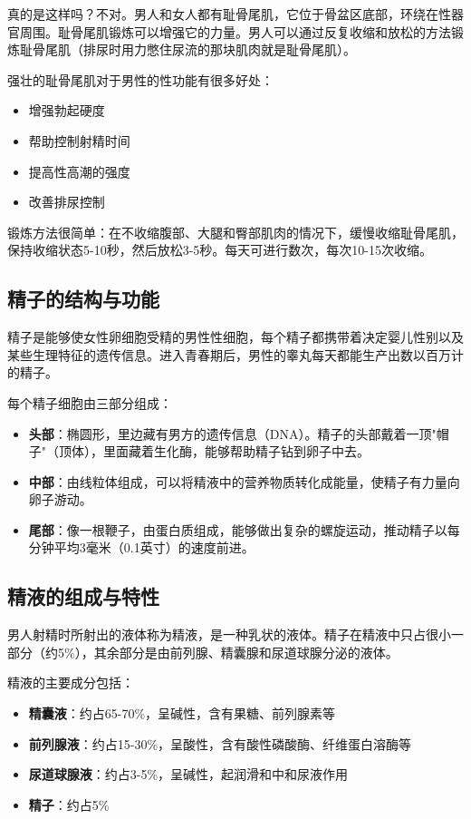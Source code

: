真的是这样吗？不对。男人和女人都有耻骨尾肌，它位于骨盆区底部，环绕在性器官周围。耻骨尾肌锻炼可以增强它的力量。男人可以通过反复收缩和放松的方法锻炼耻骨尾肌（排尿时用力憋住尿流的那块肌肉就是耻骨尾肌）。

强壮的耻骨尾肌对于男性的性功能有很多好处：
\begin{itemize}
    \item 增强勃起硬度
    \item 帮助控制射精时间
    \item 提高性高潮的强度
    \item 改善排尿控制
\end{itemize}

锻炼方法很简单：在不收缩腹部、大腿和臀部肌肉的情况下，缓慢收缩耻骨尾肌，保持收缩状态5-10秒，然后放松3-5秒。每天可进行数次，每次10-15次收缩。

\subsection{精子的结构与功能}

精子是能够使女性卵细胞受精的男性性细胞，每个精子都携带着决定婴儿性别以及某些生理特征的遗传信息。进入青春期后，男性的睾丸每天都能生产出数以百万计的精子。

每个精子细胞由三部分组成：

\begin{itemize}
    \item \textbf{头部}：椭圆形，里边藏有男方的遗传信息（DNA）。精子的头部戴着一顶"帽子"（顶体），里面藏着生化酶，能够帮助精子钻到卵子中去。
    \item \textbf{中部}：由线粒体组成，可以将精液中的营养物质转化成能量，使精子有力量向卵子游动。
    \item \textbf{尾部}：像一根鞭子，由蛋白质组成，能够做出复杂的螺旋运动，推动精子以每分钟平均3毫米（0.1英寸）的速度前进。
\end{itemize}

\subsection{精液的组成与特性}

男人射精时所射出的液体称为精液，是一种乳状的液体。精子在精液中只占很小一部分（约5\%），其余部分是由前列腺、精囊腺和尿道球腺分泌的液体。

精液的主要成分包括：
\begin{itemize}
    \item \textbf{精囊液}：约占65-70\%，呈碱性，含有果糖、前列腺素等
    \item \textbf{前列腺液}：约占15-30\%，呈酸性，含有酸性磷酸酶、纤维蛋白溶酶等
    \item \textbf{尿道球腺液}：约占3-5\%，呈碱性，起润滑和中和尿液作用
    \item \textbf{精子}：约占5\%
\end{itemize}

